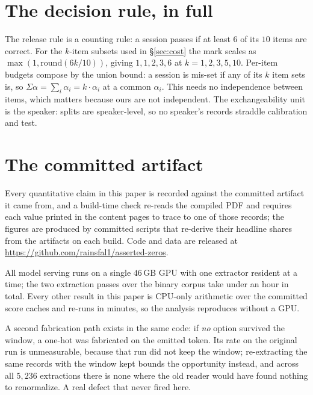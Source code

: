 \documentclass{article}
\newif\ifclaimtags\claimtagsfalse
\newcommand{\ct}[1]{\ifclaimtags\hfill{\scriptsize\textcolor{gray}{[#1]}}\fi}
\begin{document}



\appendix

\section{The decision rule, in full}\label{app:rule}
The release rule is a counting rule: a session passes if at least $6$ of its $10$
items are correct. For the $k$-item subsets used in \S\ref{sec:cost} the mark
scales as $\max(1,\mathrm{round}(6k/10))$, giving $1,1,2,3,6$ at
$k = 1,2,3,5,10$. Per-item budgets compose by the union bound: a session is
mis-set if any of its $k$ item sets is, so $\Sigma\alpha = \sum_i \alpha_i =
k\cdot\alpha_i$ at a common $\alpha_i$. This needs no independence between items,
which matters because ours are not independent. The exchangeability unit is the
speaker: splits are speaker-level, so no speaker's records straddle calibration
and test.\ct{C38, C39, C41, C45}

\section{The committed artifact}\label{app:repro}

Every quantitative claim in this paper is recorded against the committed artifact
it came from, and a build-time check re-reads the compiled PDF and requires each value printed
in the content pages to trace to one of those records; the figures are produced by
committed scripts that re-derive their headline shares from the artifacts on each
build. Code and data are released at \url{https://github.com/rainsfal1/asserted-zeros}.

All model serving runs on a single $46$\,GB GPU with one extractor resident at a
time; the two extraction passes over the binary corpus take under an hour in
total. Every other result in this paper is CPU-only arithmetic over the
committed score caches and re-runs in minutes, so the analysis reproduces
without a GPU.

A second fabrication path exists in the same code: if \emph{no} option survived
the window, a one-hot was fabricated on the emitted token. Its rate on the
original run is unmeasurable, because that run did not keep the window;
re-extracting the same records with the window kept bounds the opportunity
instead, and across all $5{,}236$ extractions there is none where the old reader
would have found nothing to renormalize. A real defect that never fired
here.\ct{C4--C5}
\end{document}
